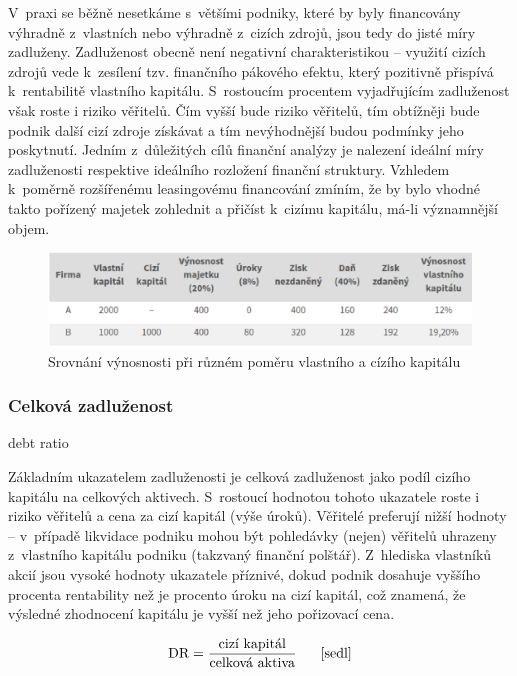 V~praxi se běžně nesetkáme s~většími podniky, které by byly financovány výhradně z~vlastních nebo výhradně z~cizích zdrojů, jsou tedy do jisté míry zadluženy. Zadluženost obecně není negativní charakteristikou -- využití cizích zdrojů vede k~zesílení tzv. finančního pákového efektu, který pozitivně přispívá k~rentabilitě vlastního kapitálu\cite{kisling}. S~rostoucím procentem vyjadřujícím zadluženost však roste i riziko věřitelů. Čím vyšší bude riziko věřitelů, tím obtížněji bude podnik další cizí zdroje získávat a tím nevýhodnější budou podmínky jeho poskytnutí\cite{mendelu}. Jedním z~důležitých cílů finanční analýzy je nalezení ideální míry zadluženosti respektive ideálního rozložení finanční struktury. Vzhledem k~poměrně rozšířenému leasingovému financování zmíním, že by bylo vhodné takto pořízený majetek zohlednit a přičíst k~cizímu kapitálu, má-li významnější objem.

\begin{figure}
  \centering
  \includegraphics[width=15cm]{img/tab.eps}
  \caption{Srovnání výnosnosti při různém poměru vlastního a cízího kapitálu}
\end{figure}

\subsubsection{Celková zadluženost}
debt ratio

Základním ukazatelem zadluženosti je celková zadluženost jako podíl cizího kapitálu na celkových aktivech. S~rostoucí hodnotou tohoto ukazatele roste i riziko věřitelů a cena za cizí kapitál (výše úroků). Věřitelé preferují nižší hodnoty -- v~případě likvidace podniku mohou být pohledávky (nejen) věřitelů uhrazeny z~vlastního kapitálu podniku (takzvaný finanční polštář).
Z~hlediska vlastníků akcií jsou vysoké hodnoty ukazatele příznivé, dokud podnik dosahuje vyššího procenta rentability než je procento úroku na cizí kapitál, což znamená, že výsledné zhodnocení kapitálu je vyšší než jeho pořizovací cena\cite{such}. 

$$\vz{DR}{cizí kapitál}{celková aktiva} \scite{sedl}$$

